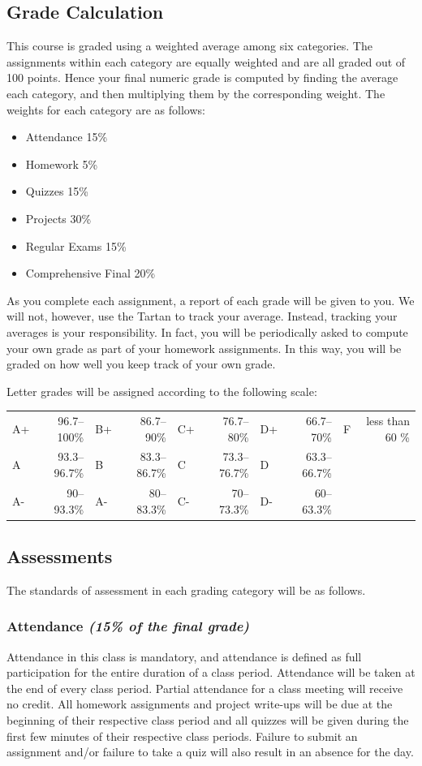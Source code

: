 \documentclass[11pt]{article}
\begin{document}
\subsection*{Grade Calculation}
This course is graded using a weighted average among six categories.  The assignments 
within each category are equally weighted and are all graded out of 100 points.  Hence your final numeric grade is computed by
finding the average each category, and then multiplying them by the corresponding weight. The
weights for each category are as follows:

\begin{itemize}
    \item Attendance 15\%
    \item Homework 5\%
    \item Quizzes 15\%
    \item Projects 30\%
    \item Regular Exams 15\%
    \item Comprehensive Final 20\%
\end{itemize}

As you complete each assignment, a report of each grade will be given to you.  We will
not, however, use the Tartan to track your average.  Instead, tracking your averages
is your responsibility.  In fact, you will be periodically asked to compute your own grade
as part of your homework assignments.  In this way, you will be graded on how well you keep track of your
own grade.

Letter grades will be assigned according to the following scale:

\begin{tabular}{|lr|lr|lr|lr|lr|}
    \hline
    A+ & 96.7--100\% & B+ & 86.7--90\% & C+ & 76.7--80\% & D+ & 66.7--70\% & F & less than 60 \% \\
    A  & 93.3--96.7\% & B & 83.3--86.7\% & C & 73.3--76.7\% & D & 63.3--66.7\% & & \\
    A- & 90--93.3\% & A- & 80--83.3\% & C- & 70--73.3\% & D- & 60--63.3\% & & \\
    \hline
\end{tabular}


\subsection*{Assessments}
The standards of assessment in each grading category will be as follows. 

\subsubsection*{Attendance {\em (15\% of the final grade)}}
Attendance in this class is
mandatory, and attendance is defined as full participation for the
entire duration of a class period. Attendance will be taken at the
end of every class period. Partial attendance for a class meeting
will receive no credit. All homework assignments and project write-ups
will be due at the beginning of their respective class period and all
quizzes will be given during the first few minutes of their respective
class periods. Failure to submit an assignment and/or failure to take
a quiz will also result in an absence for the day.
\end{document}
